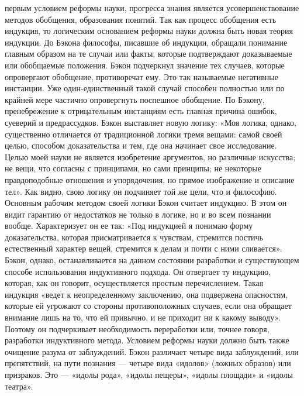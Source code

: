 \documentclass[12pt]{article}
\begin{document}
первым условием реформы науки, прогресса знания является усовершенствование методов обобщения, образования понятий.
Так как процесс обобщения есть индукция, то логическим основанием реформы науки должна 
быть новая теория индукции.
До Бэкона философы, писавшие об индукции, обращали понимание главным образом на те случаи или
факты, которые подтверждают доказываемые или обобщаемые положения. Бэкон подчеркнул значение тех
случаев,   которые   опровергают обобщение, противоречат ему. Это так называемые негативные инстанции.
Уже  один-единственный  такой  случай  способен  полностью  или  по  крайней  мере  частично  опровергнуть
поспешное обобщение. По Бэкону, пренебрежение к отрицательным инстанциям есть главная причина ошибок,
суеверий и предрассудков.
Бэкон выставляет новую логику: «Моя логика, однако, существенно отличается от традиционной логики тремя
вещами: самой своей целью, способом доказательства и тем, где она начинает свое исследование. Целью моей
науки не является изобретение аргументов, но различные искусства; не вещи, что согласны с принципами, но
сами принципы; не некоторые правдоподобные отношения и упорядочения, но прямое изображение и описание
тел». Как видно, свою логику он подчиняет той же цели, что и философию. Основным рабочим методом своей
логики Бэкон считает индукцию. В этом он видит гарантию от недостатков не только в логике, но и во всем
познании  вообще.  Характеризует  он  ее  так:  «Под  индукцией  я  понимаю  форму  доказательства,  которая
присматривается к чувствам, стремится постичь естественный характер вещей, стремится к делам и почти с
ними сливается».
Бэкон,  однако,  останавливается  на  данном  состоянии  разработки  и  существующем  способе  использования
индуктивного подхода. Он отвергает ту индукцию, которая, как он говорит, осуществляется простым
перечислением. Такая индукция «ведет к неопределенному заключению, она подвержена опасностям, которые
ей угрожают со стороны противоположных случаев, если она обращает внимание лишь на то, что ей привычно,
и не приходит ни к какому выводу». Поэтому он подчеркивает необходимость переработки или, точнее говоря,
разработки индуктивного метода.
Условием реформы науки должно быть также очищение разума от заблуждений. Бэкон различает четыре вида
заблуждений, или препятствий, на пути познания — четыре вида   «идолов»   (ложных  образов)   или
призраков. Это — «идолы рода», «идолы пещеры», «идолы площади» и «идолы театра».
\end{document}
